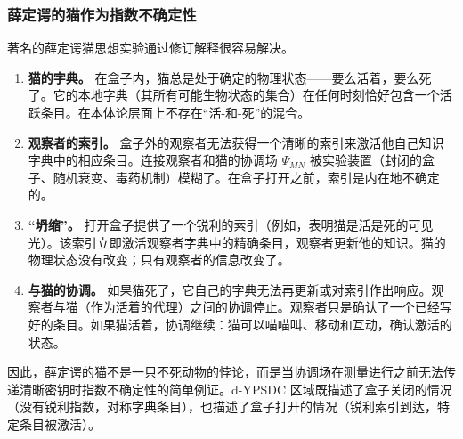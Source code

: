 \documentclass[12pt,a4paper]{article}
\theoremstyle{remark}
\begin{document}
	\subsubsection{薛定谔的猫作为指数不确定性}
	
	著名的薛定谔猫思想实验通过修订解释很容易解决。
	
	\begin{enumerate}[leftmargin=*]
		\item \textbf{猫的字典。} 在盒子内，猫总是处于确定的物理状态——要么活着，要么死了。它的本地字典（其所有可能生物状态的集合）在任何时刻恰好包含一个活跃条目。在本体论层面上不存在“活-和-死”的混合。
		\item \textbf{观察者的索引。} 盒子外的观察者无法获得一个清晰的索引来激活他自己知识字典中的相应条目。连接观察者和猫的协调场 $\Psi_{MN}$ 被实验装置（封闭的盒子、随机衰变、毒药机制）模糊了。在盒子打开之前，索引是内在地不确定的。
		\item \textbf{“坍缩”。} 打开盒子提供了一个锐利的索引（例如，表明猫是活是死的可见光）。该索引立即激活观察者字典中的精确条目，观察者更新他的知识。猫的物理状态没有改变；只有观察者的信息改变了。
		\item \textbf{与猫的协调。} 如果猫死了，它自己的字典无法再更新或对索引作出响应。观察者与猫（作为活着的代理）之间的协调停止。观察者只是确认了一个已经写好的条目。如果猫活着，协调继续：猫可以喵喵叫、移动和互动，确认激活的状态。
	\end{enumerate}
	
	因此，薛定谔的猫不是一只不死动物的悖论，而是当协调场在测量进行之前无法传递清晰密钥时指数不确定性的简单例证。d-YPSDC 区域既描述了盒子关闭的情况（没有锐利指数，对称字典条目），也描述了盒子打开的情况（锐利索引到达，特定条目被激活）。
	
\end{document}
